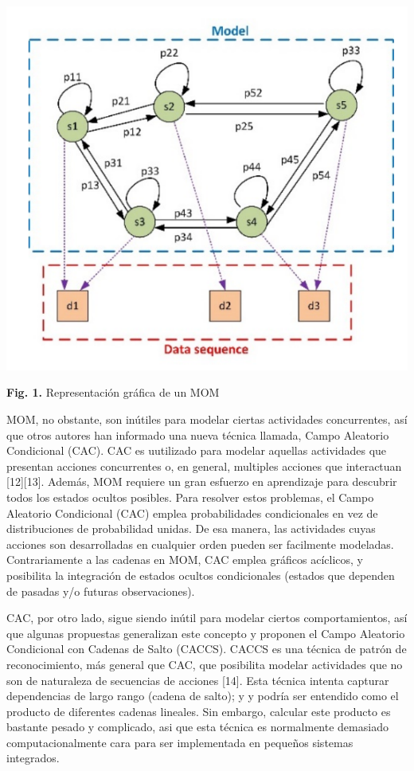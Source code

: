 \documentclass[a4paper]{article}
\begin{document}
\begin{}
\begin{}
\begin{}
\center\includegraphics{fig_1.png} 
\center\begin{}\textbf{Fig. 1.} Representación gráfica de un MOM
\setlegtth{\parindent}{<}
        \begin{}
                MOM, no obstante, son inútiles para modelar ciertas actividades concurrentes, así que otros autores han informado una nueva técnica llamada, Campo Aleatorio Condicional (CAC). CAC es uutilizado para modelar aquellas actividades que presentan acciones concurrentes o, en general, multiples acciones que interactuan [12][13]. Además, MOM requiere un gran esfuerzo en aprendizaje para descubrir todos los estados ocultos posibles. Para resolver estos problemas, el Campo Aleatorio Condicional (CAC) emplea probabilidades condicionales en vez de distribuciones de probabilidad unidas. De esa manera, las actividades cuyas acciones son desarrolladas en cualquier orden pueden ser facilmente modeladas. Contrariamente a las cadenas en MOM, CAC emplea gráficos acíclicos, y posibilita la integración de estados ocultos condicionales (estados que dependen de pasadas y/o futuras observaciones).
\setlegtth{\parindent}{<}\begin{}CAC, por otro lado, sigue siendo inútil para modelar ciertos comportamientos, así que algunas propuestas generalizan este concepto y proponen el Campo Aleatorio Condicional con Cadenas de Salto
(CACCS). CACCS es una técnica de patrón de reconocimiento, más general que CAC, que posibilita modelar actividades que no son de naturaleza de secuencias de acciones [14]. Esta técnica intenta capturar dependencias de largo rango (cadena de salto); y y podría ser entendido como el producto de diferentes cadenas lineales. Sin embargo, calcular este producto es bastante pesado y complicado, asi que esta técnica es normalmente demasiado computacionalmente cara para ser implementada en pequeños sistemas integrados.


\end{}
\end{}
\end{}
\end{}
\end{}
\end{}
\end{document}
